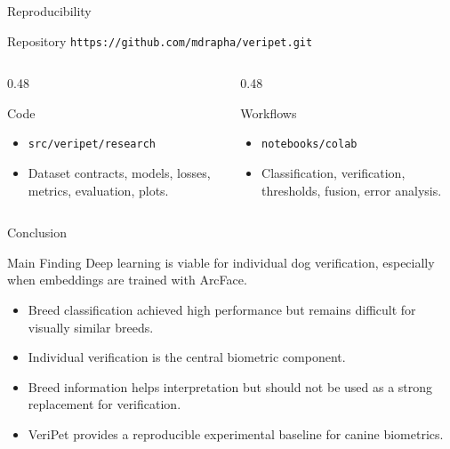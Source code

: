 \documentclass[aspectratio=169,11pt]{beamer}
\begin{document}
\begin{frame}{Reproducibility}
  \begin{block}{Repository}
    \texttt{https://github.com/mdrapha/veripet.git}
  \end{block}
  \begin{columns}[T,onlytextwidth]
    \begin{column}{0.48\textwidth}
      \begin{block}{Code}
        \begin{itemize}
          \item \texttt{src/veripet/research}
          \item Dataset contracts, models, losses, metrics, evaluation, plots.
        \end{itemize}
      \end{block}
    \end{column}
    \begin{column}{0.48\textwidth}
      \begin{block}{Workflows}
        \begin{itemize}
          \item \texttt{notebooks/colab}
          \item Classification, verification, thresholds, fusion, error analysis.
        \end{itemize}
      \end{block}
    \end{column}
  \end{columns}
\end{frame}

\begin{frame}{Conclusion}
  \begin{block}{Main Finding}
    Deep learning is viable for individual dog verification, especially when embeddings are trained with ArcFace.
  \end{block}
  \begin{itemize}
    \item Breed classification achieved high performance but remains difficult for visually similar breeds.
    \item Individual verification is the central biometric component.
    \item Breed information helps interpretation but should not be used as a strong replacement for verification.
    \item VeriPet provides a reproducible experimental baseline for canine biometrics.
  \end{itemize}
\end{frame}
\end{document}
